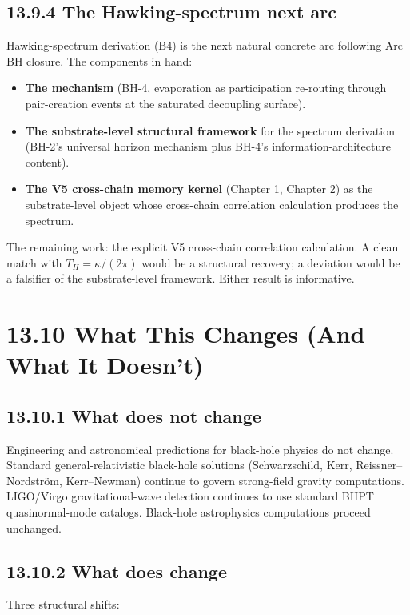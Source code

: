 \documentclass[11pt]{book}
\begin{document}
\subsection{13.9.4 The Hawking-spectrum next arc}

Hawking-spectrum derivation (B4) is the next natural concrete arc following Arc BH closure. The components in hand:
\begin{itemize}
\item \textbf{The mechanism} (BH-4, evaporation as participation re-routing through pair-creation events at the saturated decoupling surface).
\item \textbf{The substrate-level structural framework} for the spectrum derivation (BH-2's universal horizon mechanism plus BH-4's information-architecture content).
\item \textbf{The V5 cross-chain memory kernel} (Chapter 1, Chapter 2) as the substrate-level object whose cross-chain correlation calculation produces the spectrum.
\end{itemize}

The remaining work: the explicit V5 cross-chain correlation calculation. A clean match with $T_H = \kappa/(2\pi)$ would be a structural recovery; a deviation would be a falsifier of the substrate-level framework. Either result is informative.

\section{13.10 What This Changes (And What It Doesn't)}

\subsection{13.10.1 What does not change}

Engineering and astronomical predictions for black-hole physics do not change. Standard general-relativistic black-hole solutions (Schwarzschild, Kerr, Reissner–Nordström, Kerr–Newman) continue to govern strong-field gravity computations. LIGO/Virgo gravitational-wave detection continues to use standard BHPT quasinormal-mode catalogs. Black-hole astrophysics computations proceed unchanged.

\subsection{13.10.2 What does change}

Three structural shifts:
\end{document}
